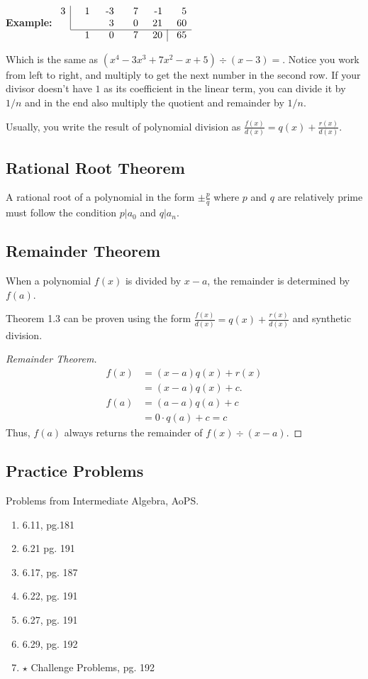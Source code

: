 \textbf{Example:}
$\begin{array}{c|rrrrr} 3&\parbox[b]{0.2in}{\raggedleft 1}&\parbox[b]{0.2in}{\raggedleft -3}&\parbox[b]{0.2in}{\raggedleft 7}&\parbox[b]{0.2in}{\raggedleft -1}&\parbox[b]{0.2in}{\raggedleft 5}\\ &&{3}&{0}&21&60 \\\cline{2-6} \multicolumn{2}{r}{{1}}& {0}&7&20&\multicolumn{1}{|r}{65} \end{array}$

Which is the same as $(x^4 - 3x^3 + 7x^2 - x + 5) \div (x - 3) = $. Notice you work from left to right, and multiply to get the next number in the second row.
If your divisor doesn't have $1$ as its coefficient in the linear term, you can divide it by $1/n$ and in the end also multiply the quotient and remainder by $1/n$.

Usually, you write the result of polynomial division as $\frac{f(x)}{d(x)}=q(x)+\frac{r(x)}{d(x)}$.

\subsection{Rational Root Theorem}
\begin{theorem}
  A rational root of a polynomial in the form $\pm\frac{p}{q}$ where $p$ and $q$ are relatively prime must follow the condition
  $p | a_0$ and $q | a_n$.
\end{theorem}

\subsection{Remainder Theorem}
\begin{theorem}
  When a polynomial $f(x)$ is divided by $x-a$, the remainder is determined by $f(a)$.
\end{theorem}

Theorem 1.3 can be proven using the form $\frac{f(x)}{d(x)}=q(x)+\frac{r(x)}{d(x)}$ and synthetic division.

\begin{proof}[Remainder Theorem]
  \begin{align*}
    f(x) &= (x-a)q(x) + r(x) \\
    &= (x-a)q(x)+c. \\
    f(a)&=(a-a)q(a)+c \\
    &=0 \cdot q(a) + c = c
  \end{align*}
  Thus, $f(a)$ always returns the remainder of $f(x) \div (x-a)$.
\end{proof}

\subsection{Practice Problems}
Problems from Intermediate Algebra, AoPS.
\begin{enumerate}
  \item 6.11, pg.181
  \item 6.21 pg. 191
  \item 6.17, pg. 187
  \item 6.22, pg. 191
  \item 6.27, pg. 191
  \item 6.29, pg. 192
  \item $\star$ Challenge Problems, pg. 192
\end{enumerate}